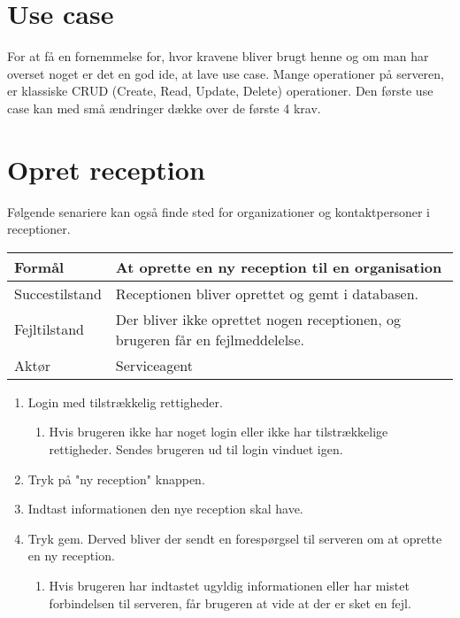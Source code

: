 \section{Use case}
For at få en fornemmelse for, hvor kravene bliver brugt henne og om man har overset noget er det en god ide, at lave use case\citep{LarmanUml}.
Mange operationer på serveren, er klassiske CRUD (Create, Read, Update, Delete) operationer. Den første use case kan med små ændringer dække over de første 4 krav.


\section{Opret reception}
Følgende senariere kan også finde sted for organizationer og kontaktpersoner i receptioner.

\begin{table}[h]
    \begin{tabular}{|p{3cm}|p{8.3cm}|}
    \hline
    Formål         & At oprette en ny reception til en organisation                              \\ \hline
    Succestilstand & Receptionen bliver oprettet og gemt i databasen.                            \\ \hline
    Fejltilstand   & Der bliver ikke oprettet nogen receptionen, og brugeren 
                     får en fejlmeddelelse. \\ \hline
    Aktør          & Serviceagent                                                                \\ \hline
    \end{tabular}
\end{table}

\begin{enumerate}
  \item Login med tilstrækkelig rettigheder.
  \begin{enumerate}
    \item Hvis brugeren ikke har noget login eller ikke har tilstrækkelige rettigheder. Sendes brugeren ud til login vinduet igen.
  \end{enumerate}
  \item Tryk på "ny reception" knappen.
  \item Indtast informationen den nye reception skal have.
  \item Tryk gem. Derved bliver der sendt en forespørgsel til serveren om at oprette en ny reception.
  \begin{enumerate}
    \item Hvis brugeren har indtastet ugyldig informationen eller har mistet forbindelsen til serveren, får brugeren at vide at der er sket en fejl.
  \end{enumerate}
\end{enumerate}

